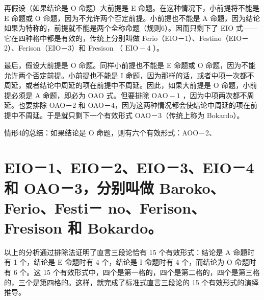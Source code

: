 再假设（如果结论是 O 命题）大前提是 E 命题。在这种情况下，小前提将不能是 E 命题或 O 命题，因为不允许两个否定前提。小前提也不能是 A 命题，因为结论如果为特称的，前提就不能是两个全称命题（规则6）。因而只剩下了 EIO 式——它在四种格中都是有效的，传统上分别叫做 Ferio（EIO－1）、Festino（EIO－2）、Ferison（EIO－3）和 Fresison （ $\mathrm{EIO}-4$ ）。

最后，假设大前提是 O 命题。同样小前提也不能是 E 命题或 O 命题，因为不能允许两个否定前提。小前提也不能是 I 命题，因为那样的话，或者中项一次都不周延，或者结论中周延的项在前提中不周延。因此，如果大前提是 O 命题，小前提必须是 A 命题，即必为 OAO 式。但要排除 $\mathrm{OAO}-1$ ，因为中项两次都不周延。也要排除 OAO－2 和 OAO－4，因为这两种情况都会使结论中周延的项在前提中不周延。于是就只剩下一个有效形式 OAO－3（传统上称为 Bokardo）。

情形4的总结：如果结论是 O 命题，则有六个有效形式：AOO－2、

\section*{EIO－1、EIO－2、EIO－3、EIO－4 和 OAO－3，分别叫做 Baroko、Ferio、Festi－ no、Ferison、Fresison 和 Bokardo。}
以上的分析通过排除法证明了直言三段论恰有 15 个有效形式：结论是 A 命题时有 1 个，结论是 E 命题时有 4 个，结论是 I 命题时有 4 个，而结论为 O 命题时有 6 个。这 15 个有效形式中，四个是第一格的，四个是第二格的，四个是第三格的，三个是第四格的。这样，就完成了标准式直言三段论的 15 个有效形式的演绎推导。 